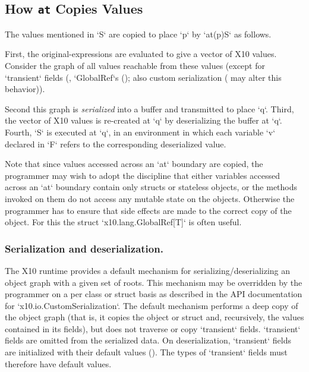 \subsection{How {\tt at} Copies Values}
\label{sect:at-init-val}


The values mentioned in \xcd`S` are copied to place \xcd`p` by \xcd`at(p)S` as follows.

First, the original-expressions are evaluated to give a vector of X10 values.
Consider the graph of all values reachable from these values (except for 
\xcd`transient` fields 
(, \xcd`GlobalRef`s (); also custom
serialization ( may alter this behavior)). 

Second this graph is {\em
serialized} into a buffer and transmitted to place \xcd`q`.  Third,
the vector of X10 values is 
re-created at \xcd`q` 
by deserializing the buffer at
\xcd`q`. Fourth, \xcd`S` is executed at \xcd`q`, in an environment in
which each variable \xcd`v` declared in \xcd`F` 
refers to the corresponding deserialized value.  

Note that since values accessed across an \xcd`at` boundary are
copied, the programmer may wish to adopt the discipline that either
variables accessed across an \xcd`at` boundary  contain only structs 
or stateless objects, or the methods invoked on them do not access any
mutable state on the objects. Otherwise the programmer has to ensure
that side effects are made to the correct copy of the object. For this
the struct \xcd`x10.lang.GlobalRef[T]` is often useful.


\subsubsection{Serialization and deserialization.}
\label{sect:ser+deser}
The X10 runtime provides a default mechanism for
serializing/deserializing an object graph with a given set of roots.
This mechanism may be overridden by the programmer on a per class or
struct basis as described in the API documentation for
\xcd`x10.io.CustomSerialization`.  
The default mechanism performs a
deep copy of the object graph (that is, it copies the object or struct
and, recursively, the values contained in its fields), but does not
traverse or copy \xcd`transient` fields. \xcd`transient` fields are omitted from the
serialized data.   On deserialization, \xcd`transient` fields are initialized
with their default values ().    The types of
\xcd`transient` fields must therefore have default values.

